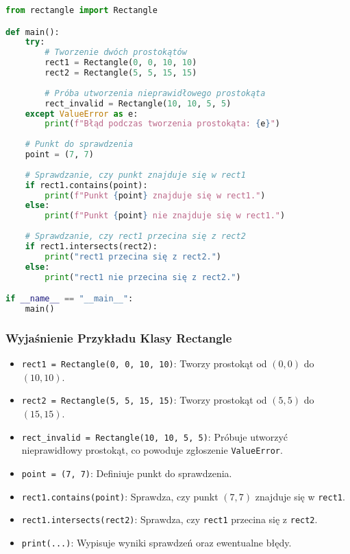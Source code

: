 \documentclass[12pt]{article}
\begin{document}
\begin{lstlisting}[language=Python, caption=Przykład użycia klasy Rectangle, style=examplestyle]
from rectangle import Rectangle

def main():
    try:
        # Tworzenie dwóch prostokątów
        rect1 = Rectangle(0, 0, 10, 10)
        rect2 = Rectangle(5, 5, 15, 15)
        
        # Próba utworzenia nieprawidłowego prostokąta
        rect_invalid = Rectangle(10, 10, 5, 5)
    except ValueError as e:
        print(f"Błąd podczas tworzenia prostokąta: {e}")
    
    # Punkt do sprawdzenia
    point = (7, 7)
    
    # Sprawdzanie, czy punkt znajduje się w rect1
    if rect1.contains(point):
        print(f"Punkt {point} znajduje się w rect1.")
    else:
        print(f"Punkt {point} nie znajduje się w rect1.")
    
    # Sprawdzanie, czy rect1 przecina się z rect2
    if rect1.intersects(rect2):
        print("rect1 przecina się z rect2.")
    else:
        print("rect1 nie przecina się z rect2.")

if __name__ == "__main__":
    main()
\end{lstlisting}

\subsubsection{Wyjaśnienie Przykładu Klasy Rectangle}

\begin{itemize}
    \item \texttt{rect1 = Rectangle(0, 0, 10, 10)}: Tworzy prostokąt od \((0,0)\) do \((10,10)\).
    \item \texttt{rect2 = Rectangle(5, 5, 15, 15)}: Tworzy prostokąt od \((5,5)\) do \((15,15)\).
    \item \texttt{rect\_invalid = Rectangle(10, 10, 5, 5)}: Próbuje utworzyć nieprawidłowy prostokąt, co powoduje zgłoszenie \texttt{ValueError}.
    \item \texttt{point = (7, 7)}: Definiuje punkt do sprawdzenia.
    \item \texttt{rect1.contains(point)}: Sprawdza, czy punkt \((7,7)\) znajduje się w \texttt{rect1}.
    \item \texttt{rect1.intersects(rect2)}: Sprawdza, czy \texttt{rect1} przecina się z \texttt{rect2}.
    \item \texttt{print(...)}: Wypisuje wyniki sprawdzeń oraz ewentualne błędy.
\end{itemize}
\end{document}

